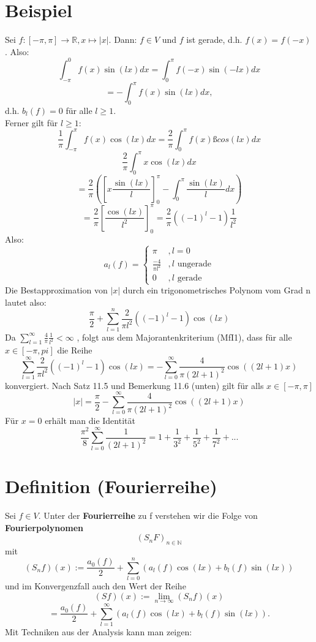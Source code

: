 \documentclass{scrbook}
\begin{document}
\section{Beispiel}
Sei $f: [-\pi , \pi] \to \mathbb{R}, x \mapsto |x|$. Dann: $f \in V$ und $f$ ist gerade, d.h. $f(x) = f(-x)$.
Also:
\[
\int^0_{-\pi} f(x) \sin(lx)dx = \int^\pi_0 f(-x) \sin(-lx)dx
\]
\[
= - \int^\pi_0 f(x) \sin (lx)dx,
\]
d.h. $b_l(f) = 0$ für alle $l \geq 1$.\\
Ferner gilt für $l \geq 1$:
\[
\frac{1}{\pi} \int^\pi_{-\pi} f(x)\cos(lx) dx = \frac{2}{\pi} \int^\pi_0 f(x) ßcos(lx)dx
\]
\[
\frac{2}{\pi} \int^\pi_0 x \cos(lx) dx
\]
\[
= \frac{2}{\pi} \left(
\left[
x  \frac{\sin(lx)}{l}
\right]^\pi_{0} - \int^\pi_0 \frac{\sin(lx)}{l}dx
\right)
\]
\[
=\frac{2}{\pi} \left[ 
\frac{\cos(lx)}{l^2}
\right]^\pi_0 = \frac{2}{\pi}((-1)^l-1)\frac{1}{l^2}
\]
Also:
\[
a_l(f) = 
\left\{
\begin{array}{cl}
\pi&,l=0\\ 
\frac{-4}{\pi l^2}&,l \text{ ungerade}\\ 
0 & ,l \text{ gerade}
\end{array}
\right.
\]
Die Bestapproximation von $|x|$ durch ein trigonometrisches Polynom vom Grad n lautet also:
\[\frac{\pi}{2} + \sum^n_{l=1} \frac{2}{\pi l^2}((-1)^l-1)\cos(lx)\]
Da $\sum^\infty_{l=1}\frac{4}{\pi}\frac{1}{l^2} < \infty $ , folgt aus dem Majorantenkriterium (MfI1), dass für alle $x \in [-\pi, pi]$ die Reihe
\[
\sum^\infty_{l=1} \frac{2}{\pi l^2} ((-1)^l -1) \cos(lx) = - \sum^\infty_{l=0} \frac{4}{\pi(2l+1)^2} \cos((2l+1)x)
\]
konvergiert. Nach Satz 11.5 und Bemerkung 11.6 (unten) gilt für alls $x \in [-\pi ,\pi]$
\[|x| = 
\frac{\pi}{2} - \sum^{\infty}_{l=0} \frac{4}{\pi(2l+1)^2} \cos((2l+1)x)
\]
Für $x = 0$ erhält man die Identität \[\frac{\pi^2}{8} \sum^\infty_{l=0}\frac{1}{(2l + 1)^2} = 1 + \frac{1}{3^2} + \frac{1}{5^2}+\frac{1}{7^2} + ... \]

\section{Definition (Fourierreihe)} Sei $f\in V$. Unter der \textbf{Fourierreihe} zu f verstehen wir die Folge von \textbf{Fourierpolynomen} 
\[(S_nF)_{n \in \mathbb{N}} \]
mit
\[(S_n f)(x):= \frac{a_0(f)}{2}+\sum^n_{l=0} (a_l(f)\cos(lx) + b_l(f)\sin(lx))\]
und im Konvergenzfall auch den Wert der Reihe
\[(Sf) (x) := \lim_{n \to \infty} (S_nf)(x)\]
\[
= \frac{a_0(f)}{2} + \sum^\infty_{l=1} (a_l(f)\cos(lx)+b_l(f)\sin (lx)).
\]
Mit Techniken aus der Analysis kann man zeigen:
\end{document}
